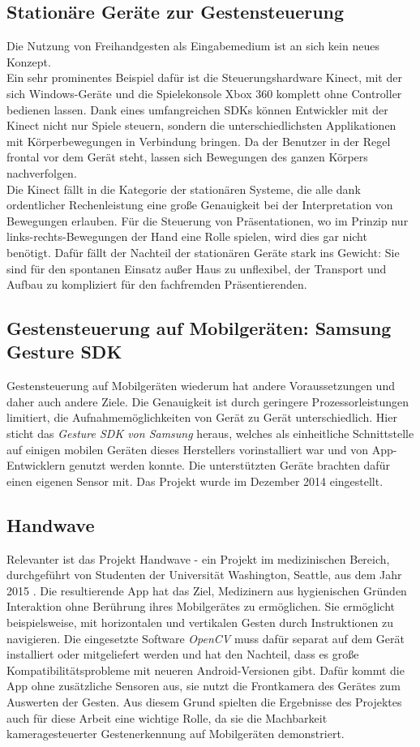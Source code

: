 \documentclass{article}
\begin{document}
\subsection{Stationäre Geräte zur Gestensteuerung}
Die Nutzung von Freihandgesten als Eingabemedium ist an sich kein neues Konzept.\\
Ein sehr prominentes Beispiel dafür ist die Steuerungshardware Kinect, mit der sich Windows-Geräte und die Spielekonsole Xbox 360 komplett ohne Controller bedienen lassen. Dank eines umfangreichen SDKs können Entwickler mit der Kinect nicht nur Spiele steuern, sondern die unterschiedlichsten Applikationen mit Körperbewegungen in Verbindung bringen. Da der Benutzer in der Regel frontal vor dem Gerät steht, lassen sich Bewegungen des ganzen Körpers nachverfolgen.\\ 
Die Kinect fällt in die Kategorie der stationären Systeme, die alle dank ordentlicher Rechenleistung eine große Genauigkeit bei der Interpretation von Bewegungen erlauben. Für die Steuerung von Präsentationen, wo im Prinzip nur links-rechts-Bewegungen der Hand eine Rolle spielen, wird dies gar nicht benötigt. Dafür fällt der Nachteil der stationären Geräte stark ins Gewicht: Sie sind für den spontanen Einsatz außer Haus zu unflexibel, der Transport und Aufbau zu kompliziert für den fachfremden Präsentierenden.
\subsection{Gestensteuerung auf Mobilgeräten: Samsung Gesture SDK}
Gestensteuerung auf Mobilgeräten wiederum hat andere Voraussetzungen und daher auch andere Ziele. Die Genauigkeit ist durch geringere Prozessorleistungen limitiert, die Aufnahmemöglichkeiten von Gerät zu Gerät unterschiedlich.
Hier sticht das \textit{Gesture SDK von Samsung} \cite{gesturesdk} heraus, welches als einheitliche Schnittstelle auf einigen mobilen Geräten dieses Herstellers vorinstalliert war und von App-Entwicklern genutzt werden konnte. Die unterstützten Geräte brachten dafür einen eigenen Sensor mit. Das Projekt wurde im Dezember 2014 eingestellt.
\subsection{Handwave}
Relevanter ist das Projekt Handwave - ein Projekt im medizinischen Bereich, durchgeführt von Studenten der Universität Washington, Seattle, aus dem Jahr 2015 \cite{Dell15}. Die resultierende App hat das Ziel, Medizinern aus hygienischen Gründen Interaktion ohne Berührung ihres Mobilgerätes zu ermöglichen. Sie ermöglicht beispielsweise, mit horizontalen und vertikalen Gesten durch Instruktionen zu navigieren. Die eingesetzte Software \textit{OpenCV} \cite{opencv} muss dafür separat auf dem Gerät installiert oder mitgeliefert werden und hat den Nachteil, dass es große Kompatibilitätsprobleme mit neueren Android-Versionen gibt. Dafür kommt die App ohne zusätzliche Sensoren aus, sie nutzt die Frontkamera des Gerätes zum Auswerten der Gesten. Aus diesem Grund spielten die Ergebnisse des Projektes auch für diese Arbeit eine wichtige Rolle, da sie die Machbarkeit kameragesteuerter Gestenerkennung auf Mobilgeräten demonstriert.
\end{document}
